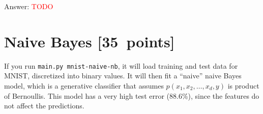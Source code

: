 \documentclass{article}
\newenvironment{answer}{\par\begingroup\color{answer}Answer: }{\endgroup}
\newcommand{\red}[1]{\textcolor{red}{#1}}
\newcommand{\pts}[1]{\textcolor{points}{[#1~points]}}
\newcommand{\TODO}{\red{TODO}}
\begin{document}
\begin{answer}\TODO\end{answer}



\clearpage
\section{Naive Bayes \pts{35}}


If you run \texttt{main.py mnist-naive-nb}, it will load training and test data for MNIST, discretized into binary values.
It will then fit a ``naive'' naive Bayes model,
which is a generative classifier that assumes $p(x_1, x_2,\dots,x_d,y)$ is product of Bernoullis.
This model has a very high test error (88.6\%), since the features do not affect the predictions.
\end{document}
